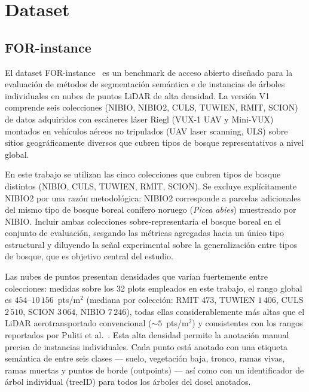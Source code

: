 \documentclass[runningheads]{llncs}
\begin{document}

\section{Dataset}\label{sec:dataset}

\subsection{FOR-instance}

El dataset FOR-instance~\cite{puliti2023} es un benchmark de acceso abierto dise\~nado para la evaluaci\'on de m\'etodos de segmentaci\'on sem\'antica e de instancias de \'arboles individuales en nubes de puntos LiDAR de alta densidad. La versi\'on V1 comprende seis colecciones (NIBIO, NIBIO2, CULS, TUWIEN, RMIT, SCION) de datos adquiridos con esc\'aneres l\'aser Riegl (VUX-1 UAV y Mini-VUX) montados en veh\'iculos a\'ereos no tripulados (UAV laser scanning, ULS) sobre sitios geogr\'aficamente diversos que cubren tipos de bosque representativos a nivel global.

En este trabajo se utilizan las cinco colecciones que cubren tipos de bosque distintos (NIBIO, CULS, TUWIEN, RMIT, SCION). Se excluye expl\'icitamente NIBIO2 por una raz\'on metodol\'ogica: NIBIO2 corresponde a parcelas adicionales del mismo tipo de bosque boreal con\'ifero noruego (\emph{Picea abies}) muestreado por NIBIO. Incluir ambas colecciones sobre-representar\'ia el bosque boreal en el conjunto de evaluaci\'on, sesgando las m\'etricas agregadas hacia un \'unico tipo estructural y diluyendo la se\~nal experimental sobre la generalizaci\'on entre tipos de bosque, que es objetivo central del estudio.

Las nubes de puntos presentan densidades que var\'ian fuertemente entre colecciones: medidas sobre los 32 plots empleados en este trabajo, el rango global es $454$--$10\,156$~pts/m$^2$ (mediana por colecci\'on: RMIT $473$, TUWIEN $1\,406$, CULS $2\,510$, SCION $3\,064$, NIBIO $7\,246$), todas ellas considerablemente m\'as altas que el LiDAR aerotransportado convencional (${\sim}5$~pts/m$^2$) y consistentes con los rangos reportados por Puliti et al.~\cite{puliti2023}. Esta alta densidad permite la anotaci\'on manual precisa de instancias individuales. Cada punto est\'a anotado con una etiqueta sem\'antica de entre seis clases --- suelo, vegetaci\'on baja, tronco, ramas vivas, ramas muertas y puntos de borde (outpoints) --- as\'i como con un identificador de \'arbol individual (treeID) para todos los \'arboles del dosel anotados.
\end{document}
